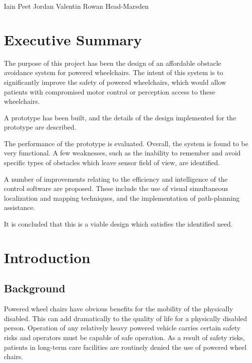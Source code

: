 \documentclass[oneside,final,a4paper]{report}
\begin{document}
Iain Peet \hspace{2cm} Jordan Valentin \hspace{2cm} Rowan Head-Marsden
\clearpage

\pagestyle{plain}
\setcounter{page}{1}

\setcounter{tocdepth}{1}
\tableofcontents

\listoffigures
{}

\chapter*{Executive Summary}
The purpose of this project has been the design of an affordable obstacle avoidance system for powered wheelchairs.  The intent of this system is to significantly improve the safety of powered wheelchairs, which would allow patients with compromised motor control or perception access to these wheelchairs.

A prototype has been built, and the details of the design implemented for the prototype are described.  

The performance of the prototype is evaluated.  Overall, the system is found to be very functional.  A few weaknesses, such as the inability to remember and avoid specific types of obstacles which leave sensor field of view, are identified.

A number of improvements relating to the efficiency and intelligence of the control software are proposed.  These include the use of visual simultaneous localization and mapping techniques, and the implementation of  path-planning assistance.

It is concluded that this is a viable design which satisfies the identified need.

\clearpage
\setcounter{page}{1}
\pagestyle{headings}

\chapter{Introduction}
\section{Background}
Powered wheel chairs have obvious benefits for the mobility of the physically disabled. This can add dramatically to the quality of life for a physically disabled person. Operation of any relatively heavy powered vehicle carries certain safety risks and operators must be capable of safe operation. As a result of safety risks, patients in long-term care facilities are routinely denied the use of powered wheel chairs. 
\end{document}
